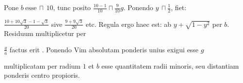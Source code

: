 Pone $b\ \text{esse}\, \sqcap\, 10$, tunc posito
%
$\displaystyle\frac{10 - 1}{10} \sqcap \displaystyle\frac{9}{10} g$.
Ponendo $y\, \sqcap \displaystyle\frac{1}{2}$,
fiet:\rule[-4mm]{0mm}{10mm} $\displaystyle\frac{10 + 10 \sqrt3 - 1 - \sqrt3}{20}$ sive $\displaystyle\frac{9 + 9 \sqrt3}{20}$ etc. 
\pend%
\newpage
\pstart%
Regula ergo haec est: ab $y + \sqrt{1 - y^2}$
per $b$.
Residuum multiplicetur per \rule[-4mm]{0mm}{10mm}$\displaystyle\frac{g}{a}$ factus erit
.
Ponendo Vim absolutam\protect{} ponderis unius exigui esse $g$\rule[-4mm]{0mm}{6mm}
multiplicatam per radium $1$ et $b$ esse quantitatem radii minoris,
seu distantiam ponderis\protect{} centro propioris. 
\pend
